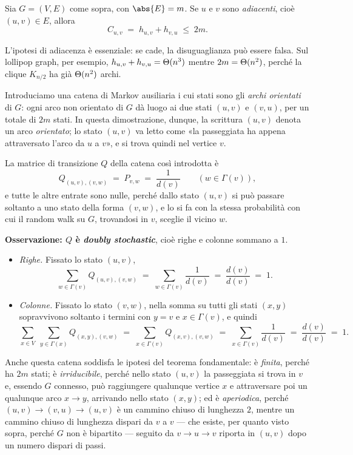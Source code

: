\begin{lemma}\label{lem:commute-arco}
  Sia $G = (V,E)$ come sopra, con $\abs{E} = m$. Se $u$ e $v$ sono \emph{adiacenti}, cioè
  $(u,v) \in E$, allora
  \[
    C_{u,v} \;=\; h_{u,v} + h_{v,u} \;\le\; 2m .
  \]
\end{lemma}

L'ipotesi di adiacenza è essenziale: se cade, la disuguaglianza può essere falsa. Sul
lollipop graph, per esempio, $h_{u,v} + h_{v,u} = \Theta(n^{3})$ mentre $2m = \Theta(n^{2})$,
perché la clique $K_{n/2}$ ha già $\Theta(n^{2})$ archi.

\begin{dimostrazione}
  Introduciamo una catena di Markov ausiliaria i cui stati sono gli \emph{archi orientati}
  di $G$: ogni arco non orientato di $G$ dà luogo ai due stati $(u,v)$ e $(v,u)$, per un
  totale di $2m$ stati. In questa dimostrazione, dunque, la scrittura $(u,v)$ denota un arco
  \emph{orientato}; lo stato $(u,v)$ va letto come «la passeggiata ha appena attraversato
  l'arco da $u$ a $v$», e si trova quindi nel vertice $v$.

  La matrice di transizione $Q$ della catena così introdotta è
  \[
    Q_{(u,v),(v,w)} \;=\; P_{v,w} \;=\; \frac{1}{d(v)}
    \qquad (w \in \Gamma(v)),
  \]
  e tutte le altre entrate sono nulle, perché dallo stato $(u,v)$ si può passare soltanto a
  uno stato della forma $(v,w)$, e lo si fa con la stessa probabilità con cui il random walk
  su $G$, trovandosi in $v$, sceglie il vicino $w$.

  \medskip
  \textbf{Osservazione: $Q$ è \emph{doubly stochastic}}, cioè righe e colonne sommano a $1$.
  \begin{itemize}
    \item \emph{Righe.} Fissato lo stato $(u,v)$,
      \[
        \sum_{w \in \Gamma(v)} Q_{(u,v),(v,w)}
        \;=\; \sum_{w \in \Gamma(v)} \frac{1}{d(v)}
        \;=\; \frac{d(v)}{d(v)} \;=\; 1 .
      \]
    \item \emph{Colonne.} Fissato lo stato $(v,w)$, nella somma su tutti gli stati $(x,y)$
      sopravvivono soltanto i termini con $y = v$ e $x \in \Gamma(v)$, e quindi
      \[
        \sum_{x \in V} \; \sum_{y \in \Gamma(x)} Q_{(x,y),(v,w)}
        \;=\; \sum_{x \in \Gamma(v)} Q_{(x,v),(v,w)}
        \;=\; \sum_{x \in \Gamma(v)} \frac{1}{d(v)}
        \;=\; \frac{d(v)}{d(v)} \;=\; 1 .
      \]
  \end{itemize}

  \medskip
  Anche questa catena soddisfa le ipotesi del teorema fondamentale: è \emph{finita}, perché
  ha $2m$ stati; è \emph{irriducibile}, perché nello stato $(u,v)$ la passeggiata si trova in
  $v$ e, essendo $G$ connesso, può raggiungere qualunque vertice $x$ e attraversare poi un
  qualunque arco $x \to y$, arrivando nello stato $(x,y)$; ed è \emph{aperiodica}, perché
  $(u,v) \to (v,u) \to (u,v)$ è un cammino chiuso di lunghezza $2$, mentre un cammino chiuso
  di lunghezza dispari da $v$ a $v$ --- che esiste, per quanto visto sopra, perché $G$ non è
  bipartito --- seguito da $v \to u \to v$ riporta in $(u,v)$ dopo un numero dispari di passi.


\end{dimostrazione}
